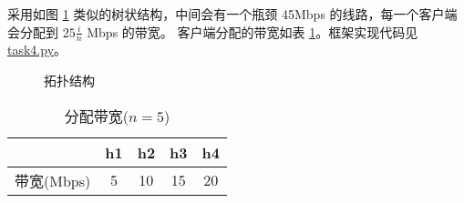     采用如图 \ref{fig:task4topo} 类似的树状结构，中间会有一个瓶颈 45Mbps 的线路，每一个客户端会分配到 $25\frac{i}{n}$ Mbps 的带宽。
    客户端分配的带宽如表 \ref{tab:bandwidth}。框架实现代码见 \href{./task4.py}{\ttfamily task4.py}。

    \noindent
    \begin{minipage}{0.5\textwidth}
        \begin{figure}[H]
            \centering
            
            \caption{拓扑结构}\label{fig:task4topo}
        \end{figure}
    \end{minipage}
    \begin{minipage}{0.5\textwidth}
        \begin{table}[H]
        \centering
        \caption{分配带宽($n=5$)}\label{tab:bandwidth}
        \begin{tabular}{ccccc}
            \toprule
                & h1 & h2 & h3 & h4\\
            \midrule
            带宽(Mbps) & 5 & 10 & 15 & 20 \\
            \bottomrule
        \end{tabular}
    \end{table}
    \end{minipage}
    \vspace*{5pt}
    
